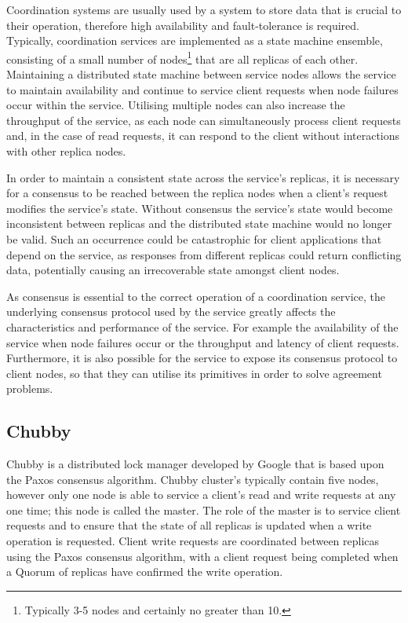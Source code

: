 Coordination systems are usually used by a system to store data that is crucial to their operation, therefore high availability and fault-tolerance is required. Typically, coordination services are implemented as a state machine ensemble, consisting of a small number of nodes\footnote{Typically 3-5 nodes and certainly no greater than 10.} that are all replicas of each other.  Maintaining a distributed state machine between service nodes allows the service to maintain availability and continue to service client requests when node failures occur within the service. Utilising multiple nodes can also increase the throughput of the service, as each node can simultaneously process client requests and, in the case of read requests, it can respond to the client without interactions with other replica nodes.  

In order to maintain a consistent state across the service's replicas, it is necessary for a consensus to be reached between the replica nodes when a client's request modifies the service's state.  Without consensus the service's state would become inconsistent between replicas and the distributed state machine would no longer be valid.  Such an occurrence could be catastrophic for client applications that depend on the service, as responses from different replicas could return conflicting data, potentially causing an irrecoverable state amongst client nodes.  

As consensus is essential to the correct operation of a coordination service, the underlying consensus protocol used by the service greatly affects the characteristics and performance of the service.  For example the availability of the service when node failures occur or the throughput and latency of client requests.  Furthermore, it is also possible for the service to expose its consensus protocol to client nodes, so that they can utilise its primitives in order to solve agreement problems\citep{Guerraoui:2001:GCS:359555.359565}.  


	\subsection{Chubby}
	Chubby\citep{Burrows:2006:CLS:1298455.1298487} is a distributed lock manager developed by Google that is based upon the Paxos\citep{Lamport:1998:PP:279227.279229}\citep{Lamport:2001:PaxosMadeSimple} consensus algorithm. Chubby cluster's typically contain five nodes, however only one node is able to service a client's read and write requests at any one time; this node is called the master. The role of the master is to service client requests and to ensure that the state of all replicas is updated when a write operation is requested.  Client write requests are coordinated between replicas using the Paxos consensus algorithm, with a client request being completed when a Quorum of replicas have confirmed the write operation.  
	
